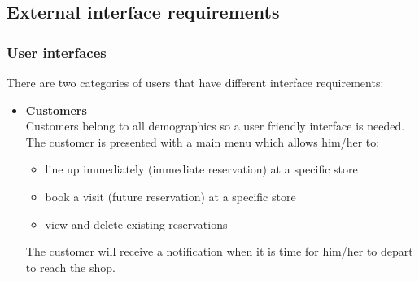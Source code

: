 \subsection{External interface requirements}
\subsubsection{User interfaces}
There are two categories of users that have different interface requirements:
\begin{itemize}
	\item {\bfseries Customers}\\
	Customers belong to all demographics so a user friendly interface is needed. The customer is presented with a main menu which allows him/her to:
	\begin{itemize}
		\item line up immediately (immediate reservation) at a specific store
		\item book a visit (future reservation) at a specific store
		\item view and delete existing reservations
	\end{itemize}
	The customer will receive a notification when it is time for him/her to depart to reach the shop.\\\\

\end{itemize}
